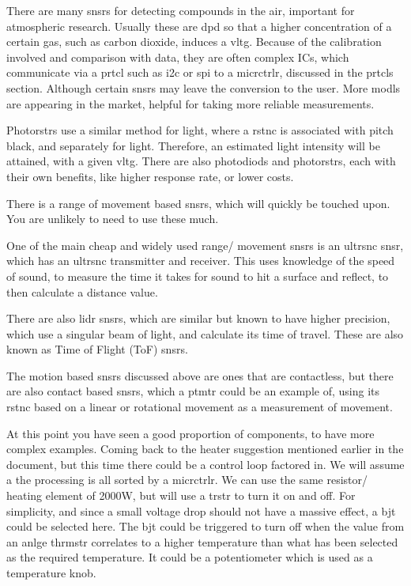 \documentclass[a4paper,11pt]{report}
\newcommand{\Examples}[1] %
{
\par\noindent %
\phantomsection %
\todo[inline, color=red!30]{\textbf{#1}} %
\vspace{1em} %
}
\begin{document}
There are many \gls{snsr}s for detecting compounds in the air, important for atmospheric research. Usually these are \gls{dpd} so that a higher concentration of a certain gas, such as carbon dioxide, induces a \gls{vltg}. Because of the calibration involved and comparison with data, they are often complex ICs, which communicate via a \gls{prtcl} such as \gls{i2c} or \gls{spi} to a \gls{micrctrlr}, discussed in the \gls{prtcl}s section. Although certain \gls{snsr}s may leave the conversion to the user. More \gls{modl}s are appearing in the market, helpful for taking more reliable measurements.


Photo\gls{rstr}s use a similar method for light, where a \gls{rstnc} is associated with pitch black, and separately for light. Therefore, an estimated light intensity will be attained, with a given \gls{vltg}. There are also photo\gls{diod}s and photo\gls{rstr}s, each with their own benefits, like higher response rate, or lower costs.


There is a range of movement based \gls{snsr}s, which will quickly be touched upon. You are unlikely to need to use these much.

One of the main cheap and widely used range/ movement \gls{snsr}s is an \gls{ultrsnc} \gls{snsr}, which has an \gls{ultrsnc} transmitter and receiver. This uses knowledge of the speed of sound, to measure the time it takes for sound to hit a surface and reflect, to then calculate a distance value.

There are also \gls{lidr} \gls{snsr}s, which are similar but known to have higher precision, which use a singular beam of light, and calculate its time of travel. These are also known as Time of Flight (ToF) \gls{snsr}s.

The motion based \gls{snsr}s discussed above are ones that are contactless, but there are also contact based \gls{snsr}s, which a \gls{ptmtr} could be an example of, using its \gls{rstnc} based on a linear or rotational movement as a measurement of movement.

\Examples{Examples}

At this point you have seen a good proportion of components, to have more complex examples. Coming back to the heater suggestion mentioned earlier in the document, but this time there could be a control loop factored in. We will assume a the processing is all sorted by a \gls{micrctrlr}. We can use the same resistor/ heating element of 2000W, but will use a \gls{trstr} to turn it on and off. For simplicity, and since a small voltage drop should not have a massive effect, a \gls{bjt} could be selected here. The \gls{bjt} could be triggered to turn off when the value from an \gls{anlge} \gls{thrmstr} correlates to a higher temperature than what has been selected as the required temperature. It could be a potentiometer which is used as a temperature knob.
\end{document}

